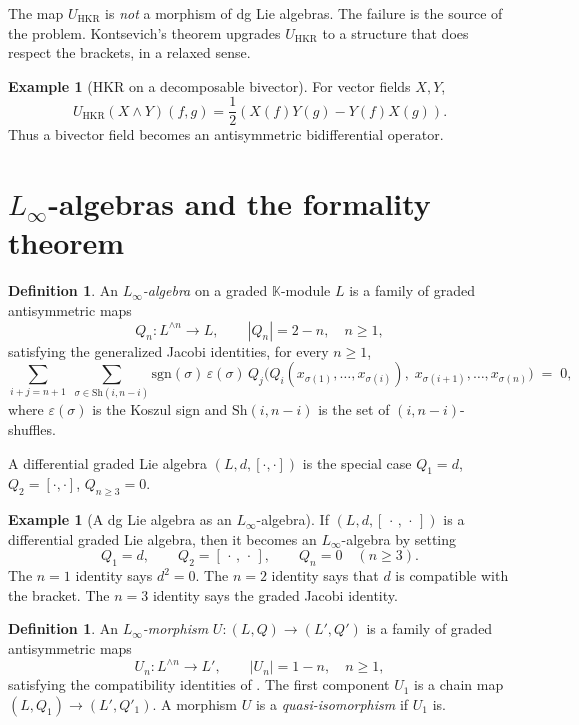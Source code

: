 \documentclass[11pt,a4paper]{article}
\theoremstyle{definition}
\newtheorem{definition}[theorem]{Definition}
\newtheorem{example}[theorem]{Example}
\newcommand{\K}{\mathbb{K}}
\newcommand{\defi}[1]{\emph{#1}}
\begin{document}
The map $U_{\mathrm{HKR}}$ is \emph{not} a morphism of dg Lie algebras.
The failure is the source of the problem. Kontsevich's theorem upgrades
$U_{\mathrm{HKR}}$ to a structure that does respect the brackets, in a
relaxed sense.

\begin{example}[HKR on a decomposable bivector]
\label{ex:hkr}
For vector fields $X,Y$,
\[
U_{\mathrm{HKR}}(X\wedge Y)(f,g)
=\frac12\left(X(f)Y(g)-Y(f)X(g)\right).
\]
Thus a bivector field becomes an antisymmetric bidifferential operator.
\end{example}

\section{\texorpdfstring{$L_\infty$}{L-infinity}-algebras and the formality theorem}\label{sec:Linfty}

\begin{definition}\label{def:Linfty}
An \defi{$L_\infty$-algebra} on a graded $\K$-module $L$ is a family of
graded antisymmetric maps
\[
Q_{n} \colon L^{\wedge n} \to L, \qquad |Q_{n}| = 2 - n,\quad n \ge 1,
\]
satisfying the generalized Jacobi identities, for every $n \ge 1$,
\begin{equation*}
\sum_{i+j=n+1}\;\sum_{\sigma \in \mathrm{Sh}(i,n-i)}
\mathrm{sgn}(\sigma)\, \varepsilon(\sigma)\,
Q_{j}\!\bigl(Q_{i}(x_{\sigma(1)}, \dots, x_{\sigma(i)}),\;
x_{\sigma(i+1)}, \dots, x_{\sigma(n)}\bigr) \;=\; 0,
\end{equation*}
where $\varepsilon(\sigma)$ is the Koszul sign and $\mathrm{Sh}(i, n-i)$
is the set of $(i, n-i)$-shuffles.
\end{definition}

A differential graded Lie algebra $(L, d, [\cdot,\cdot])$ is the special
case $Q_{1} = d$, $Q_{2} = [\cdot,\cdot]$, $Q_{n \ge 3} = 0$.

\begin{example}[A dg Lie algebra as an $L_\infty$-algebra]
\label{ex:dgla-linfty}
If $(L,d,[\,\cdot\,,\,\cdot\,])$ is a differential graded Lie algebra,
then it becomes an $L_\infty$-algebra by setting
\[
Q_1=d,\qquad Q_2=[\,\cdot\,,\,\cdot\,],\qquad Q_n=0\quad(n\ge3).
\]
The $n=1$ identity says $d^2=0$. The $n=2$ identity says that $d$ is
compatible with the bracket. The $n=3$ identity says the graded Jacobi
identity.
\end{example}

\begin{definition}\label{def:Linfty-morphism}
An \defi{$L_\infty$-morphism} $U \colon (L, Q) \to (L', Q')$ is a family
of graded antisymmetric maps
\[
U_{n} \colon L^{\wedge n} \to L', \qquad |U_{n}| = 1 - n,\quad n \ge 1,
\]
satisfying the compatibility identities of \cite[\S3.4]{Kontsevich2003}.
The first component $U_{1}$ is a chain map $(L, Q_{1}) \to (L', Q'_{1})$.
A morphism $U$ is a \defi{quasi-isomorphism} if $U_{1}$ is.
\end{definition}
\end{document}
